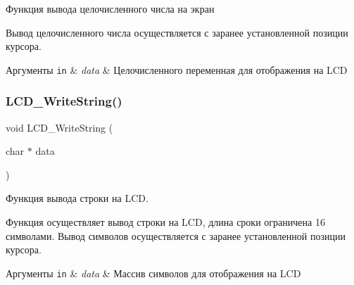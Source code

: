 Функция вывода целочисленного числа на экран 

Вывод целочисленного числа осуществляется с заранее установленной позиции курсора. 
\begin{DoxyParams}[1]{Аргументы}
\mbox{\tt in}  & {\em data} & Целочисленного переменная для отображения на L\+CD \\
\hline
\end{DoxyParams}
\mbox{\label{group___l_c_d_ga3f2811cf6b42d44a54d3ec825ed04872}} 
\subsubsection{\texorpdfstring{L\+C\+D\+\_\+\+Write\+String()}{LCD\_WriteString()}}
{\footnotesize\ttfamily void L\+C\+D\+\_\+\+Write\+String (\begin{DoxyParamCaption}\item[{char $\ast$}]{data }\end{DoxyParamCaption})}



Функция вывода строки на L\+CD. 

Функция осуществляет вывод строки на L\+CD, длина сроки ограничена 16 символами. Вывод символов осуществляется с заранее установленной позиции курсора. 
\begin{DoxyParams}[1]{Аргументы}
\mbox{\tt in}  & {\em data} & Массив символов для отображения на L\+CD \\
\hline
\end{DoxyParams}
